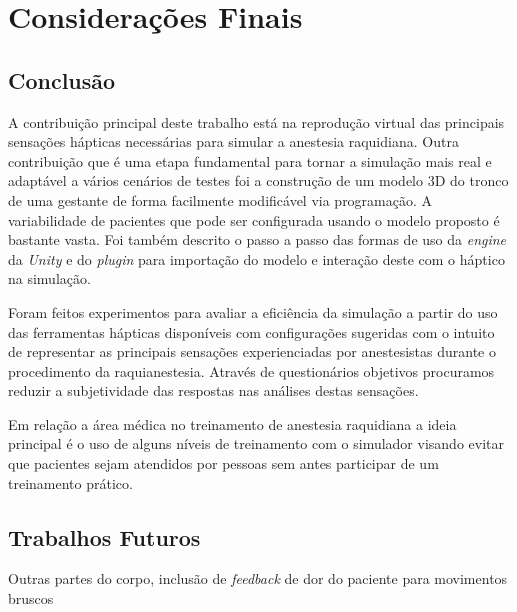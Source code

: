 \chapter{Considerações Finais} \label{cap:cap6}

\section{Conclusão}
\label{sec:conclusão}

A contribuição principal deste trabalho está na reprodução virtual das principais sensações hápticas necessárias para simular a anestesia raquidiana. Outra contribuição que é uma etapa fundamental para tornar a simulação mais real e adaptável a vários cenários de testes foi a construção de um modelo 3D do tronco de uma gestante de forma facilmente modificável via programação. A variabilidade de pacientes que pode ser configurada usando o modelo proposto é bastante vasta. Foi também descrito o passo a passo das formas de uso da \textit{engine} da \textit{Unity} e do \textit{plugin} para importação do modelo e interação deste com o háptico na simulação. 

Foram feitos experimentos para avaliar a eficiência da simulação a partir do uso das ferramentas hápticas disponíveis com configurações sugeridas com o intuito de representar as principais sensações experienciadas por anestesistas durante o procedimento da raquianestesia. Através de questionários objetivos procuramos reduzir a subjetividade das respostas nas análises destas sensações.

Em relação a área médica no treinamento de anestesia raquidiana a ideia principal é o uso de alguns níveis de treinamento com o simulador visando evitar que pacientes sejam atendidos por pessoas sem antes participar de um treinamento prático.

\section{Trabalhos Futuros}
\label{sec:trabFuturo}

Outras partes do corpo, inclusão de \textit{feedback} de dor do paciente para movimentos bruscos  